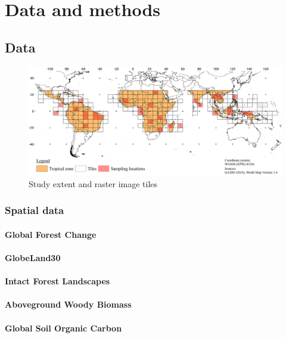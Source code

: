 \section{Data and methods}
\label{sec:datamethods}

\subsection{Data}
\label{subsec:data}

	\begin{figure}[ht]
		\centering
		\includegraphics[scale=.97]{img/method_overview_frameless}
		\caption[Study extent]{Study extent and raster image tiles}
		\label{fig:studyextent}
	\end{figure}

	\subsubsection{Spatial data}
		\paragraph{Global Forest Change}
		\paragraph{GlobeLand30}
		\paragraph{Intact Forest Landscapes}
		\paragraph{Aboveground Woody Biomass}
		\paragraph{Global Soil Organic Carbon}
